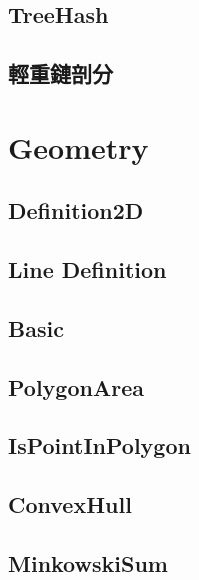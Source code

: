 \subsection{TreeHash}


\subsection{輕重鏈剖分}

\section{Geometry}

\subsection{Definition2D}


\subsection{Line Definition}


\subsection{Basic}


\subsection{PolygonArea}


\subsection{IsPointInPolygon}


\subsection{ConvexHull}


\subsection{MinkowskiSum}


